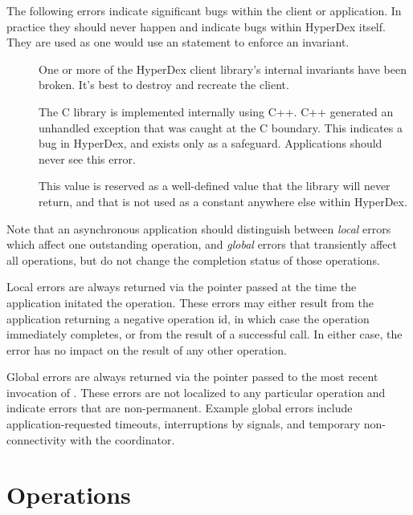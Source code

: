 The following errors indicate significant bugs within the client or application.
In practice they should never happen and indicate bugs within HyperDex itself.
They are used as one would use an  statement to enforce an
invariant.

\begin{description}
\item[] One or more of the HyperDex client
    library's internal invariants have been broken.  It's best to destroy and
    recreate the client.
\item[] The C library is implemented
    internally using C++.  C++ generated an unhandled exception that was caught
    at the C boundary.  This indicates a bug in HyperDex, and exists only as a
    safeguard.  Applications should never see this error.
\item[] This value is reserved as a well-defined
    value that the library will never return, and that is not used as a constant
    anywhere else within HyperDex.
\end{description}

Note that an asynchronous application should distinguish between {\em local}
errors which affect one outstanding operation, and {\em global} errors that
transiently affect all operations, but do not change the completion status of
those operations.

Local errors are always returned via the  pointer passed at the time the application
initated the operation.  These errors may either result from the application
returning a negative operation id, in which case the operation immediately
completes, or from the result of a successful 
call.  In either case, the error has no impact on the result of any other
operation.

Global errors are always returned via the  pointer passed to the most recent invocation of
.  These errors are not localized to any particular
operation and indicate errors that are non-permanent.  Example global errors
include application-requested timeouts, interruptions by signals, and temporary
non-connectivity with the coordinator.

\section{Operations}
\label{sec:api:c:client:ops}

